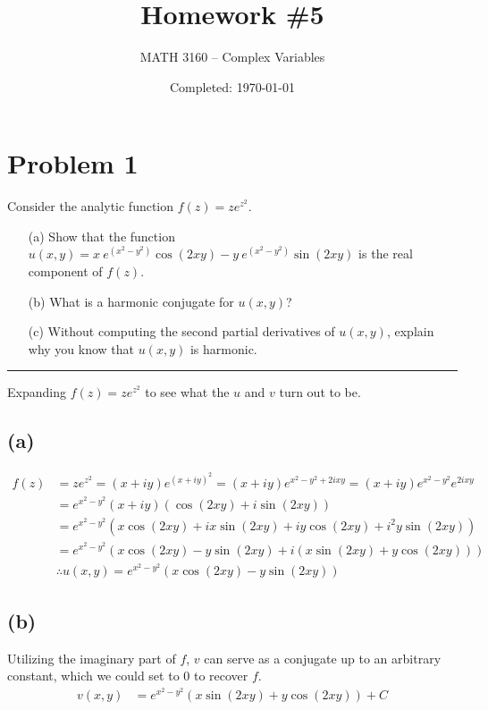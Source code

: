 \documentclass{article}
\title{Homework \#5}
\author{
	MATH 3160 -- Complex Variables\\
	\myauthor
}
\date{Completed: \today}
\let\oldcos\cos
\let\oldsin\sin
\renewcommand{\cos}[1]{\oldcos\left(#1\right)}
\renewcommand{\sin}[1]{\oldsin\left(#1\right)}
\begin{document}
\maketitle %


\section*{Problem 1}
Consider the analytic function $f(z) = z e^{z^2}$.
\begin{enumerate}
	\item [(a)] Show that the function $u(x,y) = x \ e^{(x^2 - y^2)} \cos{2xy} - y \ e^{(x^2 - y^2)} \sin{2xy}$ is the real component of $f(z)$.
	\item [(b)] What is a harmonic conjugate for $u(x,y)$?
	\item [(c)] Without computing the second partial derivatives of $u(x,y)$, explain why you know that $u(x,y)$ is harmonic.
\end{enumerate}

\vspace{.5cm} %

\hrule %
Expanding $f(z) = z e^{z^2}$ to see what the $u$ and $v$ turn out to be.
\subsection*{(a)}
\begin{align*}
  f(z) &= z e^{z^2} = (x+iy)e^{(x+iy)^2} = (x+iy)e^{x^2-y^2+2ixy} = (x+iy)e^{x^2-y^2}e^{2ixy}\\
  &= e^{x^2-y^2}(x+iy)(\cos{2xy}+i\sin{2xy}) \\
       &= e^{x^2-y^2}(x\cos{2xy}+ix\sin{2xy} + iy\cos{2xy}+i^2y\sin{2xy})\\
       &=  e^{x^2-y^2}(x\cos{2xy}-y\sin{2xy} + i(x\sin{2xy} + y\cos{2xy}))\\
       &\therefore u(x,y) = e^{x^2-y^2}(x\cos{2xy}-y\sin{2xy})
\end{align*}
\subsection{(b)}
Utilizing the imaginary part of $f$, $v$ can serve as a conjugate up to an arbitrary constant, which we could set to 0 to recover $f$. 
\begin{align*}
v(x,y) &= e^{x^2-y^2} (x\sin{2xy} + y\cos{2xy}) + C
\end{align*}
\end{document}
